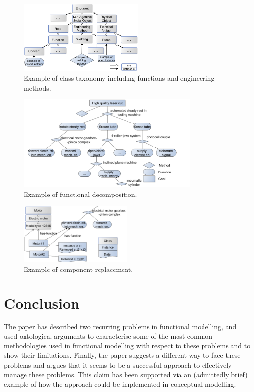 \documentclass[
]{ceurart}
\begin{document}
\begin{figure}
  \centering
  \includegraphics[width=0.55\textwidth]{class-taxonomy-small.png}
  \caption{\label{fig:class-taxonomy} Example of class taxonomy including functions and engineering methods.}
\end{figure}
\begin{figure}
  \centering
  \includegraphics[width=0.80\textwidth]{functional-decomposition-small.png}
  \caption{\label{fig:functional-decomposition} Example of functional decomposition.}
\end{figure}
\begin{figure}
  \centering
  \includegraphics[width=0.50\textwidth]{functional-decomposition-with-replacement-small.png}
  \caption{\label{fig:replacement} Example of component replacement.}
\end{figure}

\section{Conclusion}
The paper has described two recurring problems in functional modelling, and used ontological arguments to characterise some of the most common methodologies used in functional modelling with respect to these problems and to show their limitations. 
Finally, the paper suggests a different way to face these problems and argues that it seems to be a successful approach to effectively manage these problems. This claim has been supported via an (admittedly brief) example of how the approach could be implemented in conceptual modelling.
\end{document}
